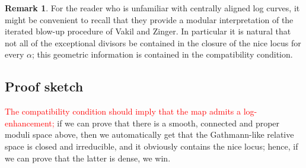 \documentclass[11pt]{amsart}
\theoremstyle{definition}
\theoremstyle{definition}
\newtheorem{remark}[thm]{Remark}
\begin{document}
\begin{remark}
 For the reader who is unfamiliar with centrally aligned log curves, it might be convenient to recall that they provide a modular interpretation of the iterated blow-up procedure of Vakil and Zinger. In particular it is natural that not all of the exceptional divisors be contained in the closure of the nice locus for every $\alpha$; this geometric information is contained in the compatibility condition.
\end{remark}

\subsection{Proof sketch} \textcolor{red}{The compatibility condition should imply that the map admits a log-enhancement;} if we can prove that there is a smooth, connected and proper moduli space above, then we automatically get that the Gathmann-like relative space is closed and irreducible, and it obviously contains the nice locus; hence, if we can prove that the latter is dense, we win.
\end{document}
